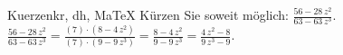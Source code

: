 \begin{MAufgabe}{Kuerzen}{kr, dh, MaTeX}
K\"urzen Sie soweit m\"oglich: $\frac{56 - 28\, z^2}{63 - 63\, z^3}$.\\ 
\ifLsg\MLoesung
\quad $\frac{56 - 28\, z^2}{63 - 63\, z^3}=\frac{(7)\cdot(8 - 4\, z^2)}{(7)\cdot(9 - 9\, z^3)}=\frac{8 - 4\, z^2}{9 - 9\, z^3}=\frac{4\, z^2 - 8}{9\, z^3 - 9}$.\else\relax\fi
 \end{MAufgabe}